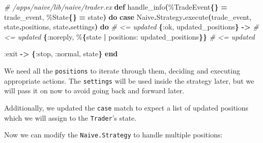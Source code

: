 \documentclass[
  oneside]{book}
\newenvironment{Shaded}{\begin{snugshade}}{\end{snugshade}}
\newcommand{\CommentTok}[1]{\textcolor[rgb]{0.56,0.35,0.01}{\textit{#1}}}
\newcommand{\ConstantTok}[1]{\textcolor[rgb]{0.56,0.35,0.01}{#1}}
\newcommand{\FunctionTok}[1]{\textcolor[rgb]{0.13,0.29,0.53}{\textbf{#1}}}
\newcommand{\KeywordTok}[1]{\textcolor[rgb]{0.13,0.29,0.53}{\textbf{#1}}}
\newcommand{\NormalTok}[1]{#1}
\newcommand{\OperatorTok}[1]{\textcolor[rgb]{0.81,0.36,0.00}{\textbf{#1}}}
\newcommand{\VariableTok}[1]{\textcolor[rgb]{0.00,0.00,0.00}{#1}}
\begin{document}
\begin{Shaded}
\begin{Highlighting}[]
  \CommentTok{\# /apps/naive/lib/naive/trader.ex}
  \KeywordTok{def}\NormalTok{ handle\_info}\FunctionTok{(}\NormalTok{\%}\ConstantTok{TradeEvent}\FunctionTok{\{\}} \OperatorTok{=}\NormalTok{ trade\_event, \%}\ConstantTok{State}\FunctionTok{\{\}} \OperatorTok{=}\NormalTok{ state}\FunctionTok{)} \KeywordTok{do}
    \KeywordTok{case} \ConstantTok{Naive}\OperatorTok{.}\ConstantTok{Strategy}\OperatorTok{.}\NormalTok{execute}\FunctionTok{(}\NormalTok{trade\_event, state}\OperatorTok{.}\NormalTok{positions, state}\OperatorTok{.}\NormalTok{settings}\FunctionTok{)} \KeywordTok{do} \CommentTok{\# \textless{}= updated}
      \FunctionTok{\{}\VariableTok{:ok}\NormalTok{, updated\_positions}\FunctionTok{\}} \OperatorTok{{-}\textgreater{}} \CommentTok{\# \textless{}= updated}
        \FunctionTok{\{}\VariableTok{:noreply}\NormalTok{, \%}\FunctionTok{\{}\NormalTok{state }\OperatorTok{|} \VariableTok{positions:}\NormalTok{ updated\_positions}\FunctionTok{\}\}} \CommentTok{\# \textless{}= updated}

      \VariableTok{:exit} \OperatorTok{{-}\textgreater{}}
        \FunctionTok{\{}\VariableTok{:stop}\NormalTok{, }\VariableTok{:normal}\NormalTok{, state}\FunctionTok{\}}
    \KeywordTok{end}
\end{Highlighting}
\end{Shaded}

We need all the \texttt{positions} to iterate through them, deciding and executing appropriate actions. The \texttt{settings} will be used inside the strategy later, but we will pass it on now to avoid going back and forward later.

Additionally, we updated the \texttt{case} match to expect a list of updated positions which we will assign to the \texttt{Trader}'s state.

Now we can modify the \texttt{Naive.Strategy} to handle multiple positions:
\end{document}
